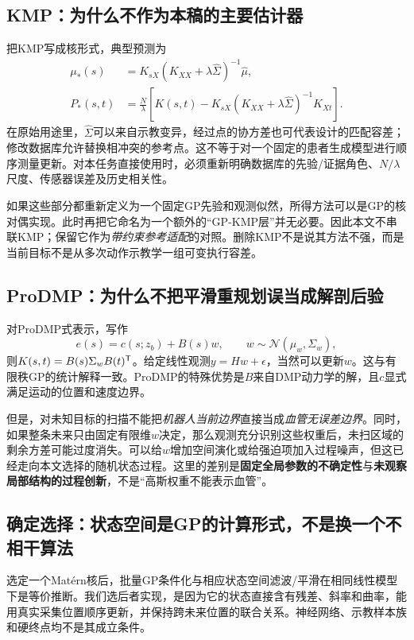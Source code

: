 \documentclass[UTF8,11pt,a4paper,fontset=fandol]{ctexart}
\numberwithin{equation}{section}
\theoremstyle{plain}
\theoremstyle{definition}
\theoremstyle{remark}
\newcommand{\Normal}{\mathcal N}\newcommand{\dd}{\mathrm d}
\begin{document}
\subsection{KMP：为什么不作为本稿的主要估计器}
把KMP写成核形式，典型预测为
\begin{align}
 \mu_*(s)&=K_{sX}(K_{XX}+\lambda\widehat\Sigma)^{-1}\widehat\mu,\\
 P_*(s,t)&=\frac{N}{\lambda}\left[K(s,t)-K_{sX}(K_{XX}+\lambda\widehat\Sigma)^{-1}K_{Xt}\right].
 \label{eq:kmp-comparison}
\end{align}
在原始用途里，$\widehat\Sigma$可以来自示教变异，经过点的协方差也可代表设计的匹配容差；修改数据库允许替换相冲突的参考点\cite{Huang2019}。这不等于对一个固定的患者生成模型进行顺序测量更新。对本任务直接使用时，必须重新明确数据库的先验/证据角色、$N/\lambda$尺度、传感器误差及历史相关性。

如果这些部分都重新定义为一个固定GP先验和观测似然，所得方法可以是GP的核对偶实现。此时再把它命名为一个额外的“GP-KMP层”并无必要。因此本文不串联KMP；保留它作为\emph{带约束参考适配}的对照。删除KMP不是说其方法不强，而是当前目标不是从多次动作示教学一组可变执行容差。

\subsection{ProDMP：为什么不把平滑重规划误当成解剖后验}
对ProDMP式表示，写作
\begin{equation}
 e(s)=c(s;z_b)+B(s)w,\qquad w\sim\Normal(\mu_w,\Sigma_w),
 \label{eq:prodmp-basis}
\end{equation}
则$K(s,t)=B(s)\Sigma_wB(t)^{\mathsf T}$。给定线性观测$y=Hw+\epsilon$，当然可以更新$w$。这与有限秩GP的统计解释一致。ProDMP的特殊优势是$B$来自DMP动力学的解，且$c$显式满足运动的位置和速度边界\cite{Li2022}。

但是，对未知目标的扫描不能把\emph{机器人当前边界}直接当成\emph{血管无误差边界}。同时，如果整条未来只由固定有限维$w$决定，那么观测充分识别这些权重后，未扫区域的剩余方差可能过度消失。可以给$w$增加空间演化或给强迫项加入过程噪声，但这已经走向本文选择的随机状态过程。这里的差别是\textbf{固定全局参数的不确定性}与\textbf{未观察局部结构的过程创新}，不是“高斯权重不能表示血管”。

\subsection{确定选择：状态空间是GP的计算形式，不是换一个不相干算法}
选定一个Mat\'ern核后，批量GP条件化与相应状态空间滤波/平滑在相同线性模型下是等价推断\cite{Hartikainen2010,SarkkaSolin2019}。我们选后者实现，是因为它的状态直接含有残差、斜率和曲率，能用真实采集位置顺序更新，并保持跨未来位置的联合关系。神经网络、示教样本族和硬终点均不是其成立条件。
\end{document}
